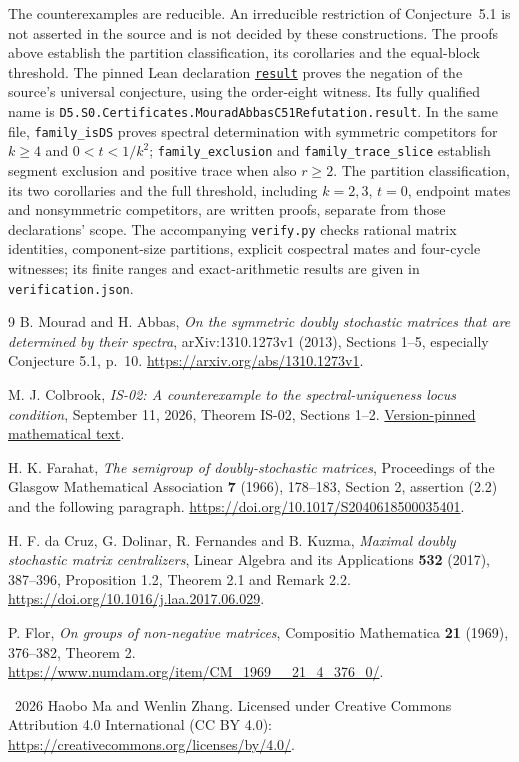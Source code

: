 \documentclass[11pt]{article}
\begin{document}
The counterexamples are reducible. An irreducible restriction of Conjecture~5.1 is not asserted in the source and is not decided by these constructions.
The proofs above establish the partition classification, its corollaries and the equal-block threshold.
The pinned Lean declaration
\href{https://github.com/the-omega-institute/trureturing/blob/d9880e9f2c329bb3db982f33791419d5d90126b9/D5/S0/Certificates/MouradAbbasC51Refutation.lean}{\texttt{result}}
proves the negation of the source's universal conjecture, using the order-eight witness. Its fully qualified name is \texttt{D5.S0.Certificates.}\allowbreak\texttt{MouradAbbasC51Refutation.result}.
In the same file, \texttt{family\_isDS} proves spectral determination with symmetric competitors for $k\geq4$ and $0<t<1/k^2$; \texttt{family\_exclusion} and \texttt{family\_trace\_slice} establish segment exclusion and positive trace when also $r\geq2$.
The partition classification, its two corollaries and the full threshold, including $k=2,3$, $t=0$, endpoint mates and nonsymmetric competitors, are written proofs, separate from those declarations' scope.
The accompanying \texttt{verify.py} checks rational matrix identities, component-size partitions, explicit cospectral mates and four-cycle witnesses; its finite ranges and exact-arithmetic results are given in \texttt{verification.json}.

\begin{thebibliography}{9}
 B. Mourad and H. Abbas,
\emph{On the symmetric doubly stochastic matrices that are determined by their spectra},
arXiv:1310.1273v1 (2013), Sections 1--5, especially Conjecture 5.1, p.~10.
\url{https://arxiv.org/abs/1310.1273v1}.

 M. J. Colbrook,
\emph{IS-02: A counterexample to the spectral-uniqueness locus condition},
September 11, 2026, Theorem IS-02, Sections 1--2.
\href{https://github.com/ajt60gaibb/OpenProblemsInNLA/blob/d25e2ccd77be39aee95f64d467a1109c0a76faf6/eigenvalues-and-inverse-problems/IS-02/solution.md}{Version-pinned mathematical text}.

 H. K. Farahat,
\emph{The semigroup of doubly-stochastic matrices},
Proceedings of the Glasgow Mathematical Association \textbf{7} (1966), 178--183,
Section 2, assertion (2.2) and the following paragraph.
\url{https://doi.org/10.1017/S2040618500035401}.

 H. F. da Cruz, G. Dolinar, R. Fernandes and B. Kuzma,
\emph{Maximal doubly stochastic matrix centralizers},
Linear Algebra and its Applications \textbf{532} (2017), 387--396,
Proposition 1.2, Theorem 2.1 and Remark 2.2.
\url{https://doi.org/10.1016/j.laa.2017.06.029}.

 P. Flor,
\emph{On groups of non-negative matrices},
Compositio Mathematica \textbf{21} (1969), 376--382, Theorem 2.
\url{https://www.numdam.org/item/CM_1969__21_4_376_0/}.
\end{thebibliography}
\smallskip
\noindent\small\textcopyright\ 2026 Haobo Ma and Wenlin Zhang.
Licensed under Creative Commons Attribution 4.0 International (CC BY 4.0):
\url{https://creativecommons.org/licenses/by/4.0/}.
\end{document}
